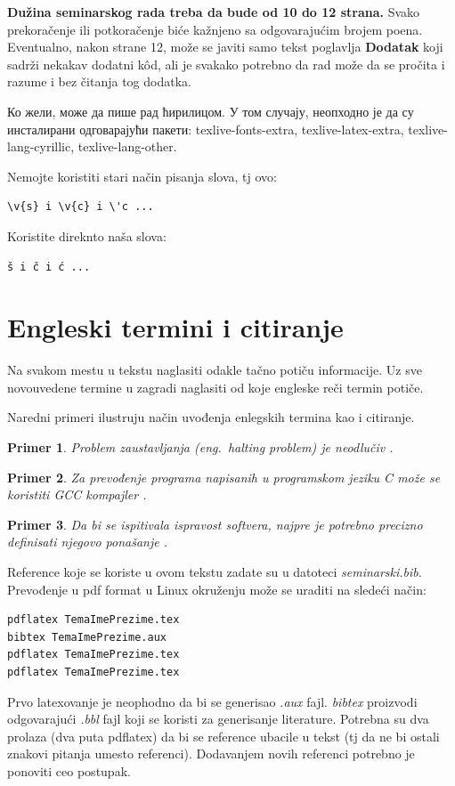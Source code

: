\documentclass[a4paper]{article}
\newtheorem{primer}{Primer}[section]
\begin{document}
\textbf{Dužina seminarskog rada treba da bude od 10 do 12 strana.} Svako prekoračenje ili potkoračenje biće kažnjeno sa odgovarajućim brojem poena. Eventualno, nakon strane 12, može se javiti samo tekst poglavlja \textbf{Dodatak} koji sadrži nekakav dodatni k\^{o}d, ali je svakako potrebno da rad može da se pročita i razume i bez čitanja tog dodatka. 

Ко жели, може да пише рад ћирилицом. У том случају, неопходно је да су инсталирани одговарајући пакети: texlive-fonts-extra, texlive-latex-extra, texlive-lang-cyrillic, texlive-lang-other. 

Nemojte koristiti stari način pisanja slova, tj ovo:
\begin{verbatim}
\v{s} i \v{c} i \'c ...
\end{verbatim}
Koristite direknto naša slova:	
\begin{verbatim}
š i č i ć ... 
\end{verbatim}


\section{Engleski termini i citiranje}	
\label{sec:termini_i_citiranje}

Na svakom mestu u tekstu naglasiti odakle tačno potiču informacije. Uz sve novouvedene termine u zagradi naglasiti od koje engleske reči termin potiče. 

Naredni primeri ilustruju način uvođenja enlegskih termina kao i citiranje.

\begin{primer}
Problem zaustavljanja (eng.~{\em halting problem}) je neodlučiv \cite{haltingproblem}.
\end{primer}

\begin{primer}
Za prevođenje programa napisanih u programskom jeziku C može se koristiti GCC kompajler \cite{gcc}.
\end{primer}

\begin{primer}
 Da bi se ispitivala ispravost softvera, najpre je potrebno precizno definisati njegovo ponašanje \cite{laski2009software}. 
\end{primer}

Reference koje se koriste u ovom tekstu zadate su u datoteci {\em seminarski.bib}. Prevođenje u pdf format u Linux okruženju može se uraditi na sledeći način:
\begin{verbatim}
pdflatex TemaImePrezime.tex 
bibtex TemaImePrezime.aux 
pdflatex TemaImePrezime.tex 
pdflatex TemaImePrezime.tex 
\end{verbatim}
Prvo latexovanje je neophodno da bi se generisao {\em .aux} fajl. {\em bibtex} proizvodi odgovarajući {\em .bbl} fajl koji se koristi za generisanje literature. 
Potrebna su dva prolaza (dva puta pdflatex) da bi se reference ubacile u tekst (tj da ne bi ostali znakovi pitanja umesto referenci). Dodavanjem novih referenci potrebno je ponoviti ceo postupak.  
\end{document}
